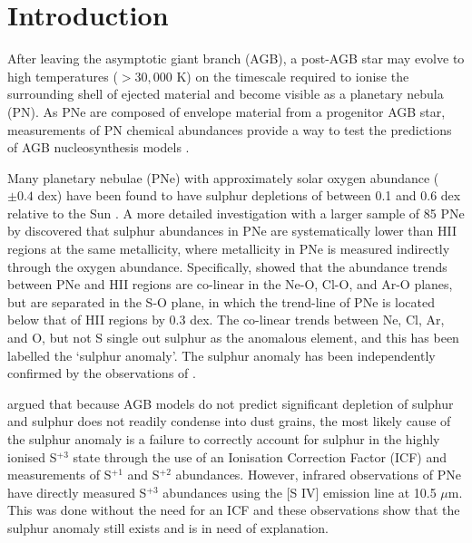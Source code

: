 \section{Introduction}
After leaving the asymptotic giant branch (AGB), a post-AGB star may evolve to high temperatures ($>30,000$ K) on the timescale required to ionise the surrounding shell of ejected material and become visible as a planetary nebula (PN). As PNe are composed of envelope material from a progenitor AGB star, measurements of PN chemical abundances provide a way to test the predictions of AGB nucleosynthesis models \citep[e.g.,][]{Marigo:2003km,Karakas:2009ha,Pottasch:2010jt,Karakas:2010ez}.

Many planetary nebulae (PNe) with approximately solar oxygen abundance ($\pm 0.4$ dex) have been found to have sulphur depletions of between 0.1 and 0.6 dex relative to the Sun \citep{Marigo:2003km}. A more detailed investigation with a larger sample of 85 PNe by \citet{Henry:2004ds} discovered that sulphur abundances in PNe are systematically lower than HII regions at the same metallicity, where metallicity in PNe is measured indirectly through the oxygen abundance. Specifically, \citet{Henry:2004ds} showed that the abundance trends between PNe and HII regions are co-linear in the Ne-O, Cl-O, and Ar-O planes, but are separated in the S-O plane, in which the trend-line of PNe is located below that of HII regions by 0.3 dex. The co-linear trends between Ne, Cl, Ar, and O, but not S single out sulphur as the anomalous element, and this has been labelled the `sulphur anomaly'. The sulphur anomaly has been independently confirmed by the observations of \citet{Milingo:2010er}.

\citet{Henry:2004ds} argued that because AGB models do not predict significant depletion of sulphur and sulphur does not readily condense into dust grains, the most likely cause of the sulphur anomaly is a failure to correctly account for sulphur in the highly ionised S$^{+3}$ state through the use of an Ionisation Correction Factor (ICF) and measurements of S$^{+1}$ and S$^{+2}$ abundances. However, infrared observations of PNe \citep[e.g.,][]{BernardSalas:2008kz} have directly measured S$^{+3}$ abundances using the [S IV] emission line at 10.5 $\mu$m. This was done without the need for an ICF and these observations show that the sulphur anomaly still exists and is in need of explanation.

